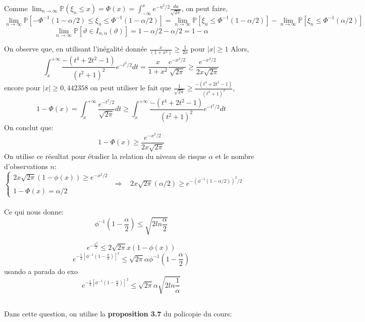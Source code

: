 \documentclass{article}
\begin{document}
Comme $\displaystyle \lim_{n \to \infty}\mathbb{P}(\xi_n \leq x)=\Phi(x) = \int_{-\infty}^xe^{-u^2/2}\frac{du}{\sqrt{2\pi}}$, on peut faire,
$$\lim_{n \to \infty}\mathbb{P}[-\Phi^{-1}(1-\alpha/2)\leq \xi_n \leq\Phi^{-1}(1-\alpha/2)]=\lim_{n \to \infty}\mathbb{P}[\xi_n \leq\Phi^{-1}(1-\alpha/2)]-\lim_{n \to \infty}\mathbb{P}[\xi_n \leq\Phi^{-1}(\alpha/2)]$$
$$\lim_{n \to \infty}\mathbb{P}[\vartheta \in I_{n,\alpha}(\vartheta)]=1-\alpha/2-\alpha/2=1-\alpha$$

On observe que, en utilisant l'inégalité donnée $\displaystyle\frac{x}{(1+x^2)} \geq \frac{1}{2x}$ pour $\displaystyle |x|\geq 1$
Alors, $$\int_{x}^{+\infty}\frac{-(t^4+2t^2-1)}{(t^2+1)^2}e^{-t^2/2}dt=\frac{x}{1+x^2}\frac{e^{-x^2/2}}{\sqrt{2\pi}} \geq \frac{e^{-x^2/2}}{2x\sqrt{2\pi}}$$
encore pour $\displaystyle |x| \geq 0,442358$ on peut utiliser le fait que $\displaystyle \frac{1}{\sqrt{2\pi}}\geq\frac{-(t^4+2t^2-1)}{(t^2+1)^2} $,
$$1-\Phi(x)=\int_x^{+\infty}\frac{e^{-t^2/2}}{\sqrt{2\pi}}dt\geq\int_{x}^{+\infty}\frac{-(t^4+2t^2-1)}{(t^2+1)^2}e^{-t^2/2}dt $$
On conclut que:
$$1-\Phi(x)\geq\frac{e^{-x^2/2}}{2x\sqrt{2\pi}}$$
On utilise ce résultat pour étudier la relation du niveau de risque $\displaystyle \alpha$ et le nombre d'observations $\displaystyle n$: \\

$ \left\{
\begin{array}{ll}
\displaystyle 2x\sqrt{2\pi}(1-\phi(x))\geq e^{-x^2/2} \\ \\
\displaystyle 1-\Phi(x) = \alpha/2
\end{array}
\right.
$
$\Longrightarrow \ \ \ \ 2x\sqrt{2\pi}(\alpha/2)\geq e^{-{(\phi^{-1}(1-\alpha/2))}^2/2}$
\\ \\
Ce qui nous donne:
$$\phi^{-1}(1-\frac{\alpha}{2})\leq \sqrt{2ln\frac{\alpha}{2}}$$

$$e^{-\frac{x^2}{2}} \leq 2\sqrt{2\pi}x(1-\phi(x))$$
$$e^{-\frac{1}{2}\left[\phi^{-1}\left(1-\frac{\alpha}{2}\right)\right]^2} \leq \sqrt{2\pi}\alpha\phi^{-1}\left(1-\frac{\alpha}{2}\right)$$
usando a parada do exo
$$e^{-\frac{1}{2}\left[\phi^{-1}\left(1-\frac{\alpha}{2}\right)\right]^2} \leq \sqrt{2\pi}\alpha\sqrt{2ln\frac{1}{\alpha}}$$


\subsection{}
Dans cette question, on utilise la \textbf{proposition 3.7} du policopie du cours:
\vspace{0.2in}
\end{document}
